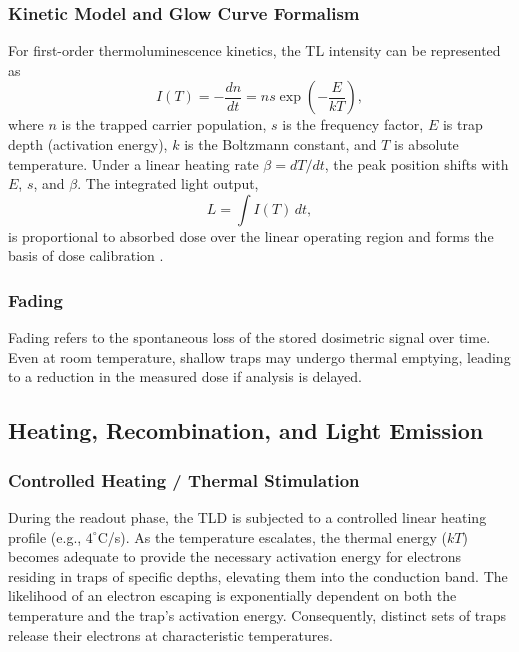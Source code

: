 \subsubsection{Kinetic Model and Glow Curve Formalism}
For first-order thermoluminescence kinetics, the TL intensity can be represented as
\begin{equation}
I(T) = -\frac{dn}{dt} = n s \exp\left(-\frac{E}{kT}\right),
\end{equation}
where $n$ is the trapped carrier population, $s$ is the frequency factor, $E$ is trap depth (activation energy), $k$ is the Boltzmann constant, and $T$ is absolute temperature. Under a linear heating rate $\beta = dT/dt$, the peak position shifts with $E$, $s$, and $\beta$. The integrated light output,
\begin{equation}
L = \int I(T)\,dt,
\end{equation}
is proportional to absorbed dose over the linear operating region and forms the basis of dose calibration \cite{rivera_thermoluminescence_2012,gibbons_khans_2020}.


\subsubsection{Fading}
Fading refers to the spontaneous loss of the stored dosimetric signal over time. Even at room temperature, shallow traps may undergo thermal emptying, leading to a reduction in the measured dose if analysis is delayed.

\subsection{Heating, Recombination, and Light Emission}

\subsubsection{Controlled Heating / Thermal Stimulation}
During the readout phase, the TLD is subjected to a controlled linear heating profile (e.g., $4^\circ$C/s). As the temperature escalates, the thermal energy ($kT$) becomes adequate to provide the necessary activation energy for electrons residing in traps of specific depths, elevating them into the conduction band. The likelihood of an electron escaping is exponentially dependent on both the temperature and the trap's activation energy. Consequently, distinct sets of traps release their electrons at characteristic temperatures.

